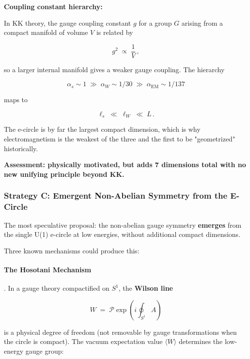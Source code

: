 \documentclass[aps,prd,preprint,superscriptaddress,longbibliography,floatfix]{revtex4-2}
\theoremstyle{remark}
\begin{document}
\textbf{Coupling constant hierarchy:}

In KK theory, the gauge coupling constant $g$ for a group $G$ arising from a compact manifold of volume $V$ is related by


\begin{equation}
    g^2 \;\propto\; \frac{1}{V} \,,
\end{equation}

so a larger internal manifold gives a weaker gauge coupling. The hierarchy


\begin{equation}
    \alpha_s \sim 1 \;\gg\; \alpha_W \sim 1/30 \;\gg\; \alpha_{\text{EM}} \sim 1/137
\end{equation}

maps to


\begin{equation}
    \ell_s \;\ll\; \ell_W \;\ll\; L \,.
\end{equation}

The e-circle is by far the largest compact dimension, which is why electromagnetism is the weakest of the three and the first to be "geometrized" historically.

\textbf{Assessment: physically motivated, but adds 7 dimensions total with no new unifying principle beyond KK.}



\subsubsection{Strategy C: Emergent Non-Abelian Symmetry from the E-Circle}

The most speculative proposal: the non-abelian gauge symmetry \textbf{emerges} from the single U(1) e-circle at low energies, without additional compact dimensions.

Three known mechanisms could produce this:


\paragraph{The Hosotani Mechanism}

\cite{Hosotani1983}. In a gauge theory compactified on $S^1$, the \textbf{Wilson line}


\begin{equation}
    W \;=\; \mathcal{P} \exp\!\left( i \oint_{S^1} A \right)
\end{equation}

is a physical degree of freedom (not removable by gauge transformations when the circle is compact). The vacuum expectation value $\langle W \rangle$ determines the low-energy gauge group:
\end{document}
